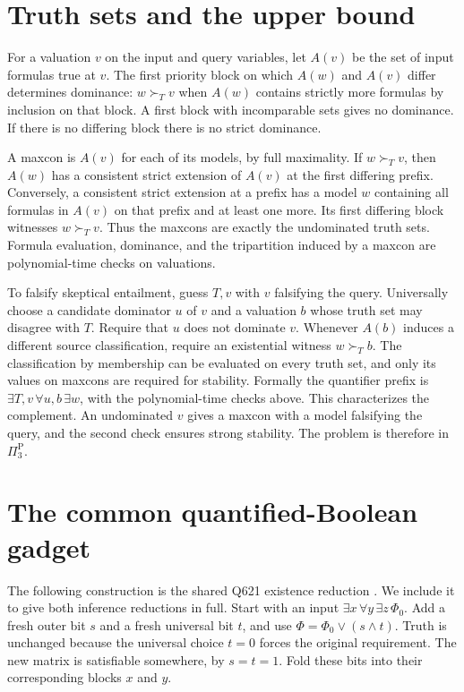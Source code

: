 \documentclass[11pt,a4paper]{amsart}
\begin{document}
\section{Truth sets and the upper bound}

For a valuation \(v\) on the input and query variables, let \(A(v)\)
be the set of input formulas true at \(v\). The first priority
block on which \(A(w)\) and \(A(v)\) differ determines dominance:
\(w\succ_T v\) when \(A(w)\) contains strictly more formulas
by inclusion on that block. A first block with incomparable sets
gives no dominance. If there is no differing block there is no
strict dominance.

A maxcon is \(A(v)\) for each of its models, by full maximality.
If \(w\succ_T v\), then \(A(w)\) has a consistent strict extension
of \(A(v)\) at the first differing prefix. Conversely, a consistent
strict extension at a prefix has a model \(w\) containing all
formulas in \(A(v)\) on that prefix and at least one more.
Its first differing block witnesses \(w\succ_T v\).
Thus the maxcons are exactly the undominated truth sets. Formula
evaluation, dominance, and the tripartition induced by a maxcon
are polynomial-time checks on valuations.

To falsify skeptical entailment, guess \(T,v\) with \(v\) falsifying
the query. Universally choose a candidate dominator \(u\) of \(v\)
and a valuation \(b\) whose truth set may disagree with \(T\).
Require that \(u\) does not dominate \(v\). Whenever \(A(b)\)
induces a different source classification, require an existential
witness \(w\succ_T b\). The classification by membership can be
evaluated on every truth set, and only its values on maxcons are
required for stability. Formally the quantifier prefix is
\(\exists T,v\,\forall u,b\,\exists w\), with the polynomial-time
checks above. This characterizes the complement. An undominated
\(v\) gives a maxcon with a model falsifying the query, and the
second check ensures strong stability. The problem is therefore
in \(\Pi_3^{\mathrm P}\).

\section{The common quantified-Boolean gadget}

The following construction is the shared Q621 existence reduction
\cite{existence}. We include it to give both inference reductions
in full. Start with an input \(\exists x\,\forall y\,\exists z\,\Phi_0\).
Add a fresh outer bit \(s\) and a fresh universal bit \(t\), and
use \(\Phi=\Phi_0\lor(s\land t)\). Truth is unchanged because the
universal choice \(t=0\) forces the original requirement. The new
matrix is satisfiable somewhere, by \(s=t=1\). Fold these bits into
their corresponding blocks \(x\) and \(y\).
\end{document}
